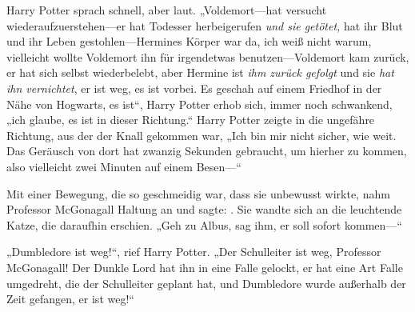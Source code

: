 Harry Potter sprach schnell, aber laut.
„Voldemort—hat versucht wiederaufzuerstehen—er hat Todesser herbeigerufen \emph{und sie getötet,} hat ihr Blut und ihr Leben gestohlen—Hermines Körper war da, ich weiß nicht warum, vielleicht wollte Voldemort ihn für irgendetwas benutzen—Voldemort kam zurück, er hat sich selbst wiederbelebt, aber Hermine ist \emph{ihm zurück gefolgt} und sie \emph{hat ihn vernichtet}, er ist weg, es ist vorbei. Es geschah auf einem Friedhof in der Nähe von Hogwarts, es ist“, Harry Potter erhob sich, immer noch schwankend, „ich glaube, es ist in dieser Richtung.“
Harry Potter zeigte in die ungefähre Richtung, aus der der Knall gekommen war, „Ich bin mir nicht sicher, wie weit. Das Geräusch von dort hat zwanzig Sekunden gebraucht, um hierher zu kommen, also vielleicht zwei Minuten auf einem Besen—“

Mit einer Bewegung, die so geschmeidig war, dass sie unbewusst wirkte, nahm Professor McGonagall Haltung an und sagte: . Sie wandte sich an die leuchtende Katze, die daraufhin erschien.
„Geh zu Albus, sag ihm, er soll sofort kommen—“

„Dumbledore ist weg!“, rief Harry Potter. „Der Schulleiter ist weg, Professor McGonagall! Der Dunkle Lord hat ihn in eine Falle gelockt, er hat eine Art Falle umgedreht, die der Schulleiter geplant hat, und Dumbledore wurde außerhalb der Zeit gefangen, er ist weg!“

